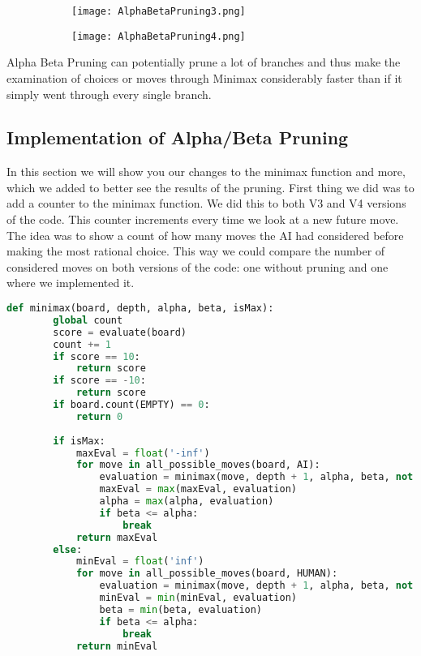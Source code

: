 \begin{figure}
    \caption{An example of branches being pruned} %
    \label{fig:AlphaBetaPruningB}
    \centering %
    \begin{subfigure}[b]{0.3\textwidth}
        \texttt{[image: AlphaBetaPruning3.png]}
    \end{subfigure}
    \begin{subfigure}[b]{0.3\textwidth}
        \texttt{[image: AlphaBetaPruning4.png]}
    \end{subfigure}
  \end{figure}

Alpha Beta Pruning can potentially prune a lot of branches and 
thus make the examination of choices or moves through Minimax considerably faster 
than if it simply went through every single branch.

\subsection{Implementation of Alpha/Beta Pruning}
\label{subsec:Implementation of Alpha/Beta Pruning}

In this section we will show you our changes to the minimax function and more, which we added to better see the results of the pruning. 
First thing we did was to add a counter to the minimax function. We did this to both V3 and V4 versions of the code. This counter increments every time we look at a new future move. 
The idea was to show a count of how many moves the AI had considered before making the most rational choice. This way we could compare the number of considered moves on both versions of the code:
one without pruning and one where we implemented it.

\begin{lstlisting}[language=python, caption={python example}, label={Script}, basicstyle=\ttfamily\small]
    def minimax(board, depth, alpha, beta, isMax):
        global count 
        score = evaluate(board)
        count += 1
        if score == 10: 
            return score
        if score == -10:
            return score
        if board.count(EMPTY) == 0:
            return 0
        
        if isMax:
            maxEval = float('-inf')
            for move in all_possible_moves(board, AI):
                evaluation = minimax(move, depth + 1, alpha, beta, not isMax)
                maxEval = max(maxEval, evaluation)
                alpha = max(alpha, evaluation)
                if beta <= alpha:
                    break
            return maxEval
        else:
            minEval = float('inf')
            for move in all_possible_moves(board, HUMAN):
                evaluation = minimax(move, depth + 1, alpha, beta, not isMax)
                minEval = min(minEval, evaluation)
                beta = min(beta, evaluation)
                if beta <= alpha:
                    break
            return minEval
\end{lstlisting}

